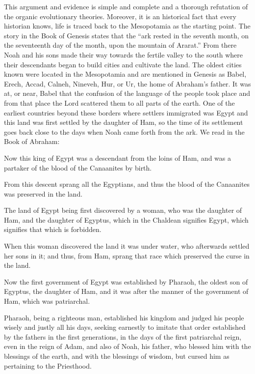 This argument and evidence is simple and complete and a thorough refutation of the organic
evolutionary theories. Moreover, it is an historical fact that every historian knows, life is
traced back to the Mesopotamia as the starting point. The story in the Book of Genesis states
that the ``ark rested in the seventh month, on the seventeenth day of the month, upon the
mountain of Ararat.'' From there Noah and his sons made their way towards the fertile valley
to the south where their descendants began to build cities and cultivate the land. The oldest
cities known were located in the Mesopotamia and are mentioned in Genesis as Babel, Erech,
Accad, Calneh, Nineveh, Hur, or Ur, the home of Abraham's father. It was at, or near, Babel
that the confusion of the language of the people took place and from that place the Lord
scattered them to all parts of the earth. One of the earliest countries beyond these borders
where settlers immigrated was Egypt and this land was first settled by the daughter of Ham,
so the time of its settlement goes back close to the days when Noah came forth from the ark.
We read in the Book of Abraham:

Now this king of Egypt was a descendant from the loins of Ham, and was a partaker of the
blood of the Canaanites by birth.

From this descent sprang all the Egyptians, and thus the blood of the Canaanites was
preserved in the land.

The land of Egypt being first discovered by a woman, who was the daughter of Ham, and the
daughter of Egyptus, which in the Chaldean signifies Egypt, which signifies that which is
forbidden.

When this woman discovered the land it was under water, who afterwards settled her sons in
it; and thus, from Ham, sprang that race which preserved the curse in the land.

Now the first government of Egypt was established by Pharaoh, the oldest son of Egyptus,
the daughter of Ham, and it was after the manner of the government of Ham, which was
patriarchal.

Pharaoh, being a righteous man, established his kingdom and judged his people wisely and
justly all his days, seeking earnestly to imitate that order established by the fathers in the first
generations, in the days of the first patriarchal reign, even in the reign of Adam, and also of
Noah, his father, who blessed him with the blessings of the earth, and with the blessings of
wisdom, but cursed him as pertaining to the Priesthood.

